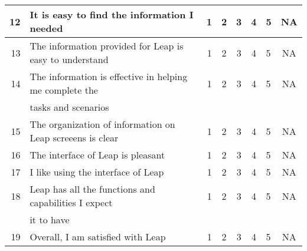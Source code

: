 \begin{table}[htbp]
\begin{tabular}{rlrccclc}
    12&It is easy to find the information I needed&1&2&3&4&5&NA\\ \hline
    13&The information provided for Leap is easy to understand&1&2&3&4&5&NA\\
    \hline
    14&The information is effective in helping me complete the &1&2&3&4&5&NA\\ 
    &tasks and scenarios\\ \hline
    15&The organization of information on Leap screeens is clear&1&2&3&4&5&NA\\
    \hline 
    16&The interface of Leap is pleasant&1&2&3&4&5&NA\\ \hline
    17&I like using the interface of Leap&1&2&3&4&5&NA\\ \hline
    18&Leap has all the functions and capabilities I expect &1&2&3&4&5&NA\\ 
    &it to have\\ \hline
    19&Overall, I am satisfied with Leap&1&2&3&4&5&NA\\ \hline
  \end{tabular}
\end{table}
